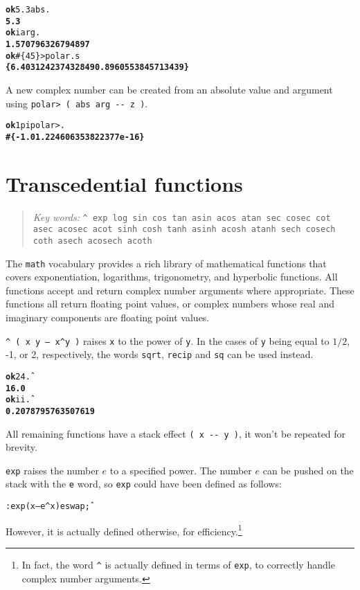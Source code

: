\documentclass[english]{book}
\newcommand{\chapkeywords}[1]{{\parbox{10cm}{\begin{minipage}[b]{10cm}
\begin{quote}
\emph{Key words:} \texttt{#1}
\end{quote}
\end{minipage}}}}
\begin{document}
\begin{alltt}
\textbf{ok} 5.3 abs .
\textbf{5.3}
\textbf{ok} i arg .
\textbf{1.570796326794897}
\textbf{ok} \#\{ 4 5 \} >polar .s
\textbf{\{ 6.403124237432849 0.8960553845713439 \}}
\end{alltt}

A new complex number can be created from an absolute value and argument using \texttt{polar> ( abs arg -{}- z )}.

\begin{alltt}
\textbf{ok} 1 pi polar> .
\textbf{\#\{ -1.0 1.224606353822377e-16 \}}
\end{alltt}

\section{Transcedential functions}

\chapkeywords{\^{} exp log sin cos tan asin acos atan sec cosec cot asec acosec acot sinh cosh tanh asinh acosh atanh sech cosech coth asech acosech acoth}

The \texttt{math} vocabulary provides a rich library of mathematical functions that covers exponentiation, logarithms, trigonometry, and hyperbolic functions. All functions accept and return complex number arguments where appropriate. These functions all return floating point values, or complex numbers whose real and imaginary components are floating point values.

\texttt{\^{} ( x y -- x\^{}y )} raises \texttt{x} to the power of \texttt{y}. In the cases of \texttt{y} being equal to $1/2$, -1, or 2, respectively, the words \texttt{sqrt}, \texttt{recip} and \texttt{sq} can be used instead.

\begin{alltt}
\textbf{ok} 2 4 \^ .
\textbf{16.0}
\textbf{ok} i i \^ .
\textbf{0.2078795763507619}
\end{alltt}

All remaining functions have a stack effect \texttt{( x -{}- y )}, it won't be repeated for brevity.

\texttt{exp} raises the number $e$ to a specified power. The number $e$ can be pushed on the stack with the \texttt{e} word, so \texttt{exp} could have been defined as follows:

\begin{alltt}
: exp ( x -- e^x ) e swap \^ ;
\end{alltt}

However, it is actually defined otherwise, for efficiency.\footnote{In fact, the word \texttt{\^{}} is actually defined in terms of \texttt{exp}, to correctly handle complex number arguments.}
\end{document}
